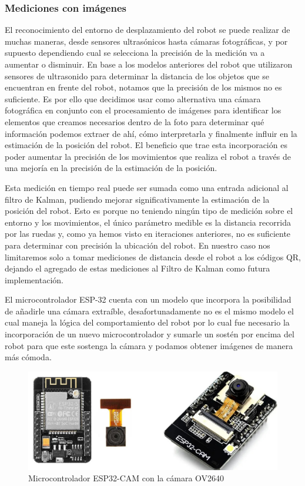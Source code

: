 \subsubsection{Mediciones con imágenes}

El reconocimiento del entorno de desplazamiento del robot se puede realizar de muchas maneras, desde sensores ultrasónicos hasta cámaras fotográficas, y por supuesto dependiendo cual se selecciona la precisión de la medición va a aumentar o disminuir.
En base a los modelos anteriores del robot que utilizaron sensores de ultrasonido para determinar la distancia de los objetos que se encuentran en frente del robot, notamos que la precisión de los mismos no es suficiente. Es por ello que decidimos usar como alternativa una cámara fotográfica en conjunto con el procesamiento de imágenes para identificar los elementos que creamos necesarios dentro de la foto para determinar qué información podemos extraer de ahí, cómo interpretarla y finalmente influir en la estimación de la posición del robot. El beneficio que trae esta incorporación es poder aumentar la precisión de los movimientos que realiza el robot a través de una mejoría en la precisión de la estimación de la posición. \cite{dey2018hands}

Esta medición en tiempo real puede ser sumada como una entrada adicional al filtro de Kalman, pudiendo mejorar significativamente la estimación de la posición del robot. Esto es porque no teniendo ningún tipo de medición sobre el entorno y los movimientos, el único parámetro medible es la distancia recorrida por las ruedas y, como ya hemos visto en iteraciones anteriores, no es suficiente para determinar con precisión la ubicación del robot. En nuestro caso nos limitaremos solo a tomar mediciones de distancia desde el robot a los códigos QR, dejando el agregado de estas mediciones al Filtro de Kalman como futura implementación.

El microcontrolador ESP-32 cuenta con un modelo que incorpora la posibilidad de añadirle una cámara extraíble, desafortunadamente no es el mismo modelo el cual maneja la lógica del comportamiento del robot por lo cual fue necesario la incorporación de un nuevo microcontrolador y sumarle un sostén por encima del robot para que este sostenga la cámara y podamos obtener imágenes de manera más cómoda.

\begin{figure}[H]
   \centering
   \includegraphics[width=0.6\linewidth]{images/esp32-cam.jpg}
   \caption{Microcontrolador ESP32-CAM con la cámara OV2640}
   \label{fig:esp32-cam}
\end{figure}

